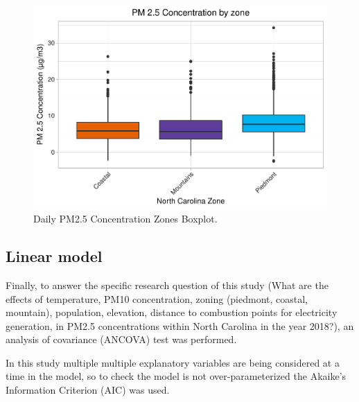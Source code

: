 \documentclass[12pt,]{article}
\newenvironment{Shaded}{\begin{snugshade}}{\end{snugshade}}
\newcommand{\KeywordTok}[1]{\textcolor[rgb]{0.13,0.29,0.53}{\textbf{#1}}}
\newcommand{\DataTypeTok}[1]{\textcolor[rgb]{0.13,0.29,0.53}{#1}}
\newcommand{\DecValTok}[1]{\textcolor[rgb]{0.00,0.00,0.81}{#1}}
\newcommand{\StringTok}[1]{\textcolor[rgb]{0.31,0.60,0.02}{#1}}
\newcommand{\CommentTok}[1]{\textcolor[rgb]{0.56,0.35,0.01}{\textit{#1}}}
\newcommand{\OperatorTok}[1]{\textcolor[rgb]{0.81,0.36,0.00}{\textbf{#1}}}
\newcommand{\NormalTok}[1]{#1}
\begin{document}
\begin{figure}
\centering
\includegraphics{Raby_ENV872_Project_files/figure-latex/unnamed-chunk-55-1.pdf}
\caption{Daily PM2.5 Concentration Zones Boxplot. \label{BOX_plot}}
\end{figure}

\subsection{Linear model}\label{linear-model}

Finally, to answer the specific research question of this study (What
are the effects of temperature, PM10 concentration, zoning (piedmont,
coastal, mountain), population, elevation, distance to combustion points
for electricity generation, in PM2.5 concentrations within North
Carolina in the year 2018?), an analysis of covariance (ANCOVA) test was
performed.

In this study multiple multiple explanatory variables are being
considered at a time in the model, so to check the model is not
over-parameterized the Akaike's Information Criterion (AIC) was used.

\begin{Shaded}
\end{Shaded}
\end{document}
